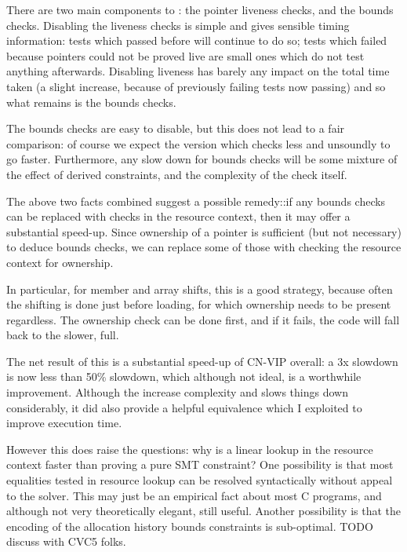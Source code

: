 
There are two main components to : the pointer liveness checks, and
the bounds checks. Disabling the liveness checks is simple and gives sensible
timing information: tests which passed before will continue to do so; tests
which failed because pointers could not be proved live are small ones which do
not test anything afterwards. Disabling liveness has barely any impact on the
total time taken (a slight increase, because of previously failing tests now
passing) and so what remains is the bounds checks.

The bounds checks are easy to disable, but this does not lead to a fair
comparison: of course we expect the version which checks less and unsoundly to
go faster. Furthermore, any slow down for bounds checks will be some mixture of
the effect of derived constraints, and the complexity of the check itself.

The above two facts combined
suggest a possible remedy::if any bounds checks can be replaced with checks in
the resource context, then it may offer a substantial speed-up. Since ownership
of a pointer is sufficient (but not necessary) to deduce bounds checks, we can
replace some of those with checking the resource context for ownership.

In particular, for member and array shifts, this is a good strategy, because
often the shifting is done just before loading, for which ownership needs to be
present regardless. The ownership check can be done first, and if it fails, the
code will fall back to the slower, full.

The net result of this is a substantial speed-up of CN-VIP overall: a 3x
slowdown is now less than 50\% slowdown, which although not ideal, is a
worthwhile improvement. Although the  increase complexity and slows
things down considerably, it did also provide a helpful equivalence which I
exploited to improve execution time.

However this does raise the questions: why is a linear lookup in the resource
context faster than proving a pure SMT constraint? One possibility is that most
equalities tested in resource lookup can be resolved syntactically without
appeal to the solver. This may just be an empirical fact about most C programs,
and although not very theoretically elegant, still useful. Another possibility
is that the encoding of the allocation history bounds constraints is
sub-optimal. TODO discuss with CVC5 folks.

